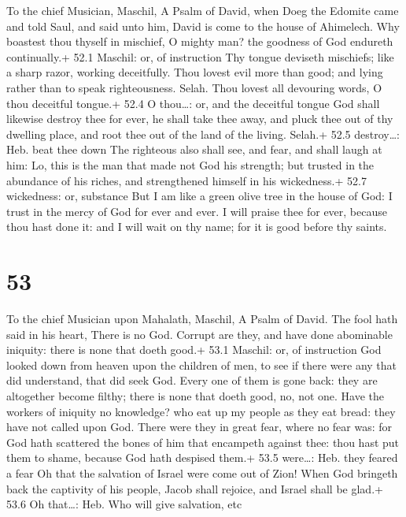 To the chief Musician, Maschil, A Psalm of David, when Doeg the Edomite
came and told Saul, and said unto him, David is come to the house of
Ahimelech.  Why boastest thou thyself in mischief, O mighty
man? the goodness of God endureth continually.+ 52.1 Maschil: or, of
instruction  Thy tongue deviseth mischiefs; like a sharp
razor, working deceitfully.  Thou lovest evil more than
good; and lying rather than to speak righteousness. Selah. 
Thou lovest all devouring words, O thou deceitful tongue.+ 52.4 O
thou\ldots: or, and the deceitful tongue  God shall likewise
destroy thee for ever, he shall take thee away, and pluck thee out of
thy dwelling place, and root thee out of the land of the living. Selah.+
52.5 destroy\ldots: Heb. beat thee down  The righteous also
shall see, and fear, and shall laugh at him:  Lo, this is
the man that made not God his strength; but trusted in the abundance of
his riches, and strengthened himself in his wickedness.+ 52.7
wickedness: or, substance  But I am like a green olive tree
in the house of God: I trust in the mercy of God for ever and ever.
 I will praise thee for ever, because thou hast done it: and
I will wait on thy name; for it is good before thy saints.

\hypertarget{section-52}{%
\section{53}\label{section-52}}

To the chief Musician upon Mahalath, Maschil, A Psalm of David.
 The fool hath said in his heart, There is no God. Corrupt
are they, and have done abominable iniquity: there is none that doeth
good.+ 53.1 Maschil: or, of instruction  God looked down
from heaven upon the children of men, to see if there were any that did
understand, that did seek God.  Every one of them is gone
back: they are altogether become filthy; there is none that doeth good,
no, not one.  Have the workers of iniquity no knowledge? who
eat up my people as they eat bread: they have not called upon God.
 There were they in great fear, where no fear was: for God
hath scattered the bones of him that encampeth against thee: thou hast
put them to shame, because God hath despised them.+ 53.5 were\ldots:
Heb. they feared a fear  Oh that the salvation of Israel
were come out of Zion! When God bringeth back the captivity of his
people, Jacob shall rejoice, and Israel shall be glad.+ 53.6 Oh
that\ldots: Heb. Who will give salvation, etc


